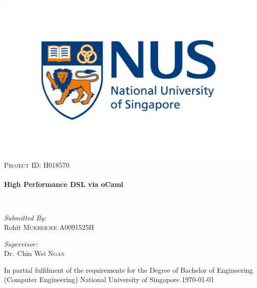 \begin{titlepage}
\begin{center}

\includegraphics[width=1\textwidth]{figures/nus_logo.jpg}\\[1cm]

\textsc{\Large Project ID: H018570}\\[0.5cm]

\HRule \\[0.4cm]
{ \huge \bfseries High Performance DSL via oCaml \\[0.4cm] }

\HRule \\[1.5cm]

\noindent
\begin{minipage}{0.4\textwidth}
\begin{flushleft} \large
\emph{Submitted By:}\\
Rohit \textsc{Mukherjee}
A0091525H
\end{flushleft}
\end{minipage}%
\begin{minipage}{0.4\textwidth}
\begin{flushright} \large
\emph{Supervisor:} \\
Dr.~Chin Wei \textsc{Ngan}
\end{flushright}
\end{minipage}
\vfill

\vspace{10 mm}
In partial fulfilment of the requirements for the Degree of 
Bachelor of Engineering (Computer Engineering) National University of Singapore 
\bigskip
{\large \today}

\end{center}
\end{titlepage}